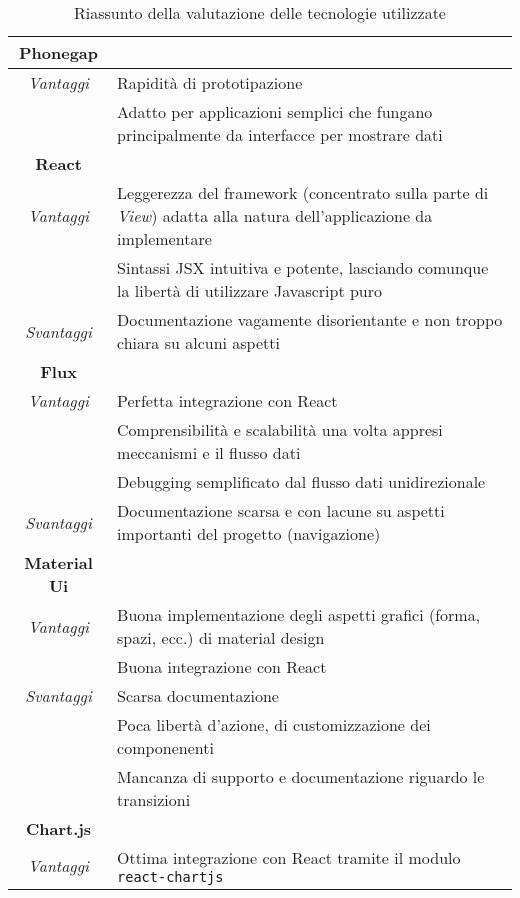 \begin{table} [H] \centering
\begin{tabularx}{\textwidth}{|c|X|}
\hline
\textbf{Phonegap} & \\ \hline
\textit{Vantaggi}
& Rapidità di prototipazione \\ \hline
& Adatto per applicazioni semplici che fungano principalmente da interfacce per mostrare dati \\ \hline \hline
\textbf{React} & \\ \hline
\textit{Vantaggi}
& Leggerezza del framework (concentrato sulla parte di \textit{View}) adatta alla natura dell'applicazione da implementare \\ \hline
& Sintassi JSX intuitiva e potente, lasciando comunque la libertà di utilizzare Javascript puro \\ \hline
\textit{Svantaggi}
& Documentazione vagamente disorientante e non troppo chiara su alcuni aspetti \\ \hline \hline
\textbf{Flux} & \\ \hline
\textit{Vantaggi}
& Perfetta integrazione con React \\ \hline
& Comprensibilità e scalabilità una volta appresi meccanismi e il flusso dati \\ \hline
& Debugging semplificato dal flusso dati unidirezionale \\ \hline 
\textit{Svantaggi}
& Documentazione scarsa e con lacune su aspetti importanti del progetto (navigazione) \\ \hline
\hline
\textbf{Material Ui} & \\ \hline
\textit{Vantaggi}
& Buona implementazione degli aspetti grafici (forma, spazi, ecc.) di material design \\ \hline
& Buona integrazione con React \\ \hline
\textit{Svantaggi}
& Scarsa documentazione \\ \hline
& Poca libertà d'azione, di customizzazione dei componenenti \\ \hline
& Mancanza di supporto e documentazione riguardo le transizioni \\ \hline \hline
\textbf{Chart.js} & \\ \hline
\textit{Vantaggi}
& Ottima integrazione con React tramite il modulo \texttt{react-chartjs} \\ \hline
\end{tabularx}
\caption{Riassunto della valutazione delle tecnologie utilizzate}
\end{table}